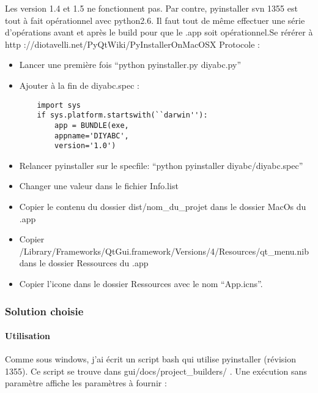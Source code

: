 \documentclass[12pt,a4paper]{article}
\begin{document}
        Les version 1.4 et 1.5 ne fonctionnent pas. Par contre, pyinstaller svn
        1355 est tout à fait op\'erationnel avec python2.6. Il faut tout de même
        effectuer une s\'erie d'op\'erations avant et après le build pour que le
        .app soit op\'erationnel.Se r\'er\'erer à \newline http
        ://diotavelli.net/PyQtWiki/PyInstallerOnMacOSX \newline Protocole : \\

        \label{mac_pyinstaller}
        \begin{itemize}
            \item Lancer une première fois ``python pyinstaller.py diyabc.py''
            \item Ajouter à la fin de diyabc.spec :
        \begin{verbatim}
    import sys 
    if sys.platform.startswith(``darwin''): 
        app = BUNDLE(exe, 
        appname='DIYABC', 
        version='1.0')
        \end{verbatim}
            \item Relancer pyinstaller sur le specfile: ``python pyinstaller diyabc/diyabc.spec''
            \item Changer une valeur dans le fichier Info.list
            \item Copier le contenu du dossier dist/nom\_du\_projet dans le dossier MacOs du .app
            \item Copier /Library/Frameworks/QtGui.framework/Versions/4/Resources/qt\_menu.nib dans le dossier Ressources du .app
            \item Copier l'icone dans le dossier Ressources avec le nom ``App.icns''.\\
        \end{itemize}

        \subsubsection{Solution choisie}
        \paragraph{Utilisation}

        Comme sous windows, j'ai écrit un script bash qui utilise pyinstaller
        (révision 1355). Ce script se trouve dans
        gui/docs/project\_builders/ .  Une exécution sans
        paramètre affiche les paramètres à fournir : \\
\end{document}

